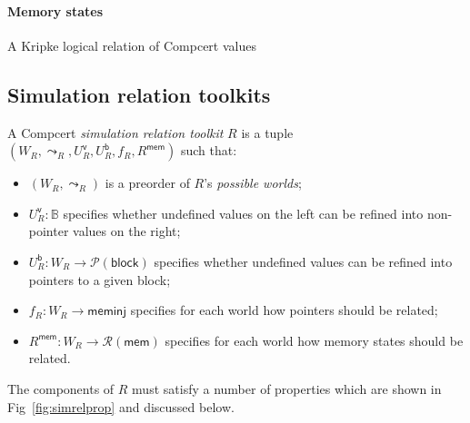 \documentclass[acmsmall,anonymous]{acmart}
\newcommand{\kw}[1]{\ensuremath{ \textsf{#1} }}
\begin{document}
\paragraph{Memory states}



A Kripke logical relation of Compcert values 

\subsection{Simulation relation toolkits} %

\begin{definition}[\kw{simrel}]
A Compcert \emph{simulation relation toolkit} $R$
is a tuple $(W_R, \leadsto_R, U^\kw{v}_R, U^\kw{b}_R, f_R, R^\kw{mem})$
such that:
\begin{itemize}
\item $(W_R, \leadsto_R)$
  is a preorder of $R$'s \emph{possible worlds};
\item $U^\kw{v}_R : \mathbb{B}$
  specifies whether undefined values on the left
  can be refined into non-pointer values on the right;
\item $U^\kw{b}_R : W_R \rightarrow \mathcal{P}(\kw{block})$
  specifies whether undefined values can be refined into pointers to a given block;
\item $f_R : W_R \rightarrow \kw{meminj}$
  specifies for each world how pointers should be related;
\item $R^\kw{mem} : W_R \rightarrow \mathcal{R}(\kw{mem})$
  specifies for each world how memory states should be related.
\end{itemize}
The components of $R$ must satisfy
a number of properties which are shown in Fig~\ref{fig:simrelprop}
and discussed below.
\end{definition}
\end{document}
